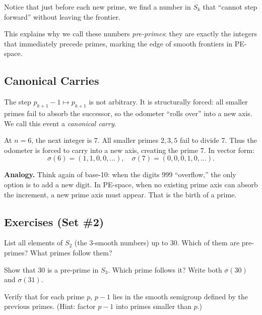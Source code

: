 \documentclass[11pt]{article}
\theoremstyle{definition}
\begin{document}
Notice that just before each new prime, 
we find a number in $S_k$ that ``cannot step forward'' without leaving the frontier. 

\begin{studentnote}
This explains why we call these numbers \emph{pre-primes}: 
they are exactly the integers that immediately precede primes, 
marking the edge of smooth frontiers in PE-space. 
\end{studentnote}

\subsection{Canonical Carries}
The step $p_{k+1}-1 \mapsto p_{k+1}$ is not arbitrary. 
It is structurally forced: all smaller primes fail to absorb the successor, 
so the odometer ``rolls over'' into a new axis. 
We call this event a \emph{canonical carry}. 

\begin{studentexample}
At $n=6$, the next integer is 7.  
All smaller primes $2,3,5$ fail to divide 7.  
Thus the odometer is forced to carry into a new axis, creating the prime 7.  
In vector form:
\[
\sigma(6) = (1,1,0,0,\dots), \quad 
\sigma(7) = (0,0,0,1,0,\dots).
\]
\end{studentexample}

\begin{studentnote}
\textbf{Analogy.}  
Think again of base-10: when the digits $999$ ``overflow,'' 
the only option is to add a new digit.  
In PE-space, when no existing prime axis can absorb the increment, 
a new prime axis must appear. That is the birth of a prime. 
\end{studentnote}

\subsection*{Exercises (Set \#2)}
\begin{studentexercise}
List all elements of $S_2$ (the $3$-smooth numbers) up to 30. 
Which of them are pre-primes? What primes follow them?
\end{studentexercise}

\begin{studentexercise}
Show that 30 is a pre-prime in $S_3$.  
Which prime follows it?  
Write both $\sigma(30)$ and $\sigma(31)$.
\end{studentexercise}

\begin{studentexercise}
Verify that for each prime $p$, $p-1$ lies in the smooth semigroup 
defined by the previous primes. 
(Hint: factor $p-1$ into primes smaller than $p$.)
\end{studentexercise}
\end{document}
